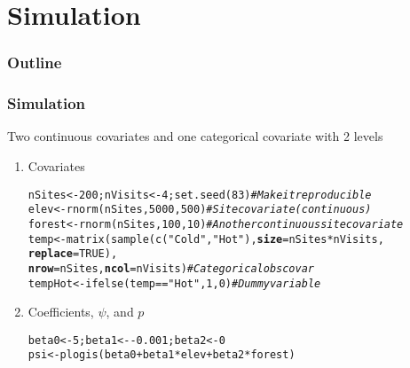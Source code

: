 \documentclass[color=usenames,dvipsnames]{beamer}\usepackage[]{graphicx}\usepackage[]{xcolor}
\makeatletter
\newcommand{\hlnum}[1]{\textcolor[rgb]{0.69,0.494,0}{#1}}%
\newcommand{\hlsng}[1]{\textcolor[rgb]{0.749,0.012,0.012}{#1}}%
\newcommand{\hlcom}[1]{\textcolor[rgb]{0.514,0.506,0.514}{\textit{#1}}}%
\newcommand{\hlopt}[1]{\textcolor[rgb]{0,0,0}{#1}}%
\newcommand{\hldef}[1]{\textcolor[rgb]{0,0,0}{#1}}%
\newcommand{\hlkwb}[1]{\textcolor[rgb]{0,0.341,0.682}{#1}}%
\newcommand{\hlkwc}[1]{\textcolor[rgb]{0,0,0}{\textbf{#1}}}%
\newcommand{\hlkwd}[1]{\textcolor[rgb]{0.004,0.004,0.506}{#1}}%
\newenvironment{kframe}{%
 \def\at@end@of@kframe{}%
 \ifinner\ifhmode%
  \def\at@end@of@kframe{\end{minipage}}%
  \begin{minipage}{\columnwidth}%
 \fi\fi%
 \def\FrameCommand##1{\hskip\@totalleftmargin \hskip-\fboxsep
 \colorbox{shadecolor}{##1}\hskip-\fboxsep
     \hskip-\linewidth \hskip-\@totalleftmargin \hskip\columnwidth}%
 \MakeFramed {\advance\hsize-\width
   \@totalleftmargin\z@ \linewidth\hsize
   \@setminipage}}%
 {\par\unskip\endMakeFramed%
 \at@end@of@kframe}
\newenvironment{knitrout}{}{} %
\makeatother
\begin{document}
\section{Simulation}



\begin{frame}
  \frametitle{Outline}
  \Large
  \tableofcontents[currentsection]
\end{frame}


\begin{frame}[fragile]
  \frametitle{Simulation}
  \small
  Two continuous covariates and one categorical covariate with 2 levels
  \vfill
  \begin{enumerate}[<+->]
  \item Covariates
\begin{knitrout}\scriptsize
{}\color{fgcolor}\begin{kframe}
\begin{alltt}
\hldef{nSites} \hlkwb{<-} \hlnum{200}\hldef{; nVisits} \hlkwb{<-} \hlnum{4}\hldef{;} \hlkwd{set.seed}\hldef{(}\hlnum{83}\hldef{)} \hlcom{# Make it reproducible}
\hldef{elev} \hlkwb{<-} \hlkwd{rnorm}\hldef{(nSites,}\hlnum{5000}\hldef{,}\hlnum{500}\hldef{)} \hlcom{# Site covariate (continuous)}
\hldef{forest} \hlkwb{<-} \hlkwd{rnorm}\hldef{(nSites,}\hlnum{100}\hldef{,}\hlnum{10}\hldef{)} \hlcom{# Another continuous site covariate}
\hldef{temp} \hlkwb{<-} \hlkwd{matrix}\hldef{(}\hlkwd{sample}\hldef{(}\hlkwd{c}\hldef{(}\hlsng{"Cold"}\hldef{,} \hlsng{"Hot"}\hldef{),} \hlkwc{size}\hldef{=nSites}\hlopt{*}\hldef{nVisits,}
                      \hlkwc{replace}\hldef{=}\hlnum{TRUE}\hldef{),}
               \hlkwc{nrow}\hldef{=nSites,} \hlkwc{ncol}\hldef{=nVisits)} \hlcom{# Categorical obs covar}
\hldef{tempHot} \hlkwb{<-} \hlkwd{ifelse}\hldef{(temp}\hlopt{==}\hlsng{"Hot"}\hldef{,} \hlnum{1}\hldef{,} \hlnum{0}\hldef{)}      \hlcom{# Dummy variable}
\end{alltt}
\end{kframe}
\end{knitrout}
  \item Coefficients, $\psi$, and $p$
\begin{knitrout}\scriptsize
{}\color{fgcolor}\begin{kframe}
\begin{alltt}
\hldef{beta0} \hlkwb{<-} \hlnum{5}\hldef{; beta1} \hlkwb{<-} \hlopt{-}\hlnum{0.001}\hldef{; beta2} \hlkwb{<-} \hlnum{0}
\hldef{psi} \hlkwb{<-} \hlkwd{plogis}\hldef{(beta0} \hlopt{+} \hldef{beta1}\hlopt{*}\hldef{elev} \hlopt{+} \hldef{beta2}\hlopt{*}\hldef{forest)}

\end{alltt}
\end{kframe}
\end{knitrout}
\end{enumerate}
\end{frame}
\end{document}
